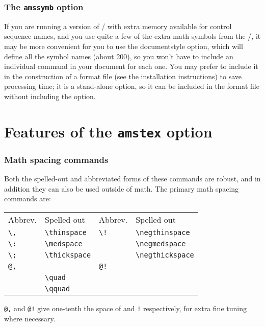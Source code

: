 \section{The {\tt amssymb} option}

If you are running a version of \latex/ with extra memory available
for control sequence names, and you use quite a few of the extra math
symbols from the \amsfonts/, it may be more convenient for you to use
the  documentstyle option, which will define all the
symbol names (about 200), so you won't have to include an individual
 command in your document for each one.  You may prefer
to include it in the construction of a format file (see the
installation instructions) to save processing time; it is a stand-alone
option, so it can be included in the format file without including the
 option.

\newpage
\part{Features of the {\tt amstex} option}

\section{Math spacing commands}
Both\indexcs{,}\indexcs{:}\indexcs{;}%
%
the spelled-out and abbreviated forms of these commands are robust, and
in addition they can also be used outside of math.
The primary math spacing commands are:
\begin{center}
\begin{tabular}{|l|l||l|l|}
Abbrev.&Spelled out&Abbrev.&Spelled out\\
\verb+\,+&\verb+\thinspace+&\verb+\!+&\verb+\negthinspace+\\
\verb+\:+&\verb+\medspace+&&\verb+\negmedspace+\\
\verb+\;+&\verb+\thickspace+&&\verb+\negthickspace+\\
\verb+@,+&&\verb+@!+&\\
&\verb+\quad+&&\\
&\verb+\qquad+&&
\end{tabular}
\end{center}
\verb"@," and
\verb"@!" give
one-tenth the space of \cs{,} and {\tt\bslash !} respectively, for extra fine tuning where necessary.

